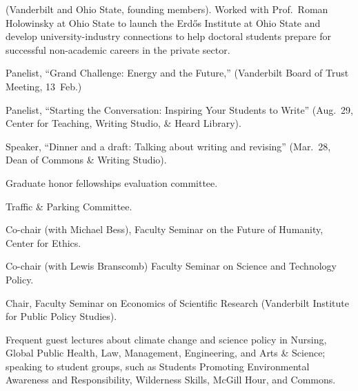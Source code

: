   (Vanderbilt and Ohio State, founding members).  Worked with Prof.\ Roman
  Holowinsky at Ohio State to launch the Erd\H{o}s Institute at Ohio State and
  develop university-industry connections to help doctoral students prepare for
  successful non-academic careers in the private sector.
\item[2015] Panelist, ``Grand Challenge: Energy and the Future,'' (Vanderbilt
  Board of Trust Meeting, 13~Feb.)
\item[2013] Panelist, ``Starting the Conversation: Inspiring Your Students to
  Write'' (Aug.~29, Center for Teaching, Writing Studio, \& Heard Library).
\item[2013] Speaker, ``Dinner and a draft: Talking about writing and revising''
  (Mar.~28, Dean of Commons \& Writing Studio).
\item[2013] Graduate honor fellowships evaluation committee.
\item[2010--2013] Traffic \& Parking Committee.
\item[2008] Co-chair (with Michael Bess), Faculty Seminar on the Future of
  Humanity, Center for Ethics.
\item[1999--2000] Co-chair (with Lewis Branscomb) Faculty Seminar on Science
  and Technology Policy.
\item[1996--1997] Chair, Faculty Seminar on Economics of Scientific Research
  (Vanderbilt Institute for Public Policy Studies).
\item[Ongoing] Frequent guest lectures about climate change and science policy
  in Nursing, Global Public Health, Law, Management, Engineering, and Arts \&
  Science; speaking to student groups, such as Students Promoting Environmental
  Awareness and Responsibility, Wilderness Skills, McGill Hour, and Commons.
